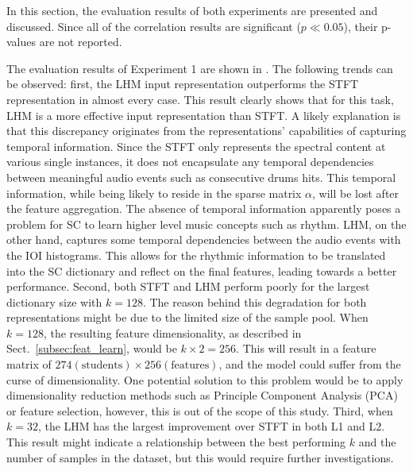 \documentclass{article}
\begin{document}
In this section, the evaluation results of both experiments are presented and discussed. Since all of the correlation results are significant ($p\ll 0.05$), their p-values are not reported.  

The evaluation results of Experiment 1 are shown in . The following trends can be observed: first, the LHM input representation outperforms the STFT representation in almost every case. This result clearly shows that for this task, LHM is a more effective input representation than STFT. A likely explanation is that this discrepancy originates from the representations' capabilities of capturing temporal information. Since the STFT only represents the spectral content at various single instances, it does not encapsulate any temporal dependencies between meaningful audio events such as consecutive drums hits. This temporal information, while being likely to reside in the sparse matrix $\alpha$, will be lost after the feature aggregation. The absence of temporal information apparently poses a problem for SC to learn higher level music concepts such as rhythm. LHM, on the other hand, captures some temporal dependencies between the audio events with the IOI histograms. This allows for the rhythmic information to be translated into the SC dictionary and reflect on the final features, leading towards a better performance. 
Second, both STFT and LHM perform poorly for the largest dictionary size with $k = 128$. The reason behind this degradation for both representations might be due to the limited size of the sample pool. When $k = 128$, the resulting feature dimensionality, as described in Sect.~\ref{subsec:feat_learn}, would be $k \times 2 = 256$. This will result in a feature matrix of $274 (\text{students}) \times 256 (\text{features})$, and the model could suffer from the curse of dimensionality. One potential solution to this problem would be to apply dimensionality reduction methods such as Principle Component Analysis (PCA) or feature selection, however, this is out of the scope of this study. 
Third, when $k = 32$, the LHM has the largest improvement over STFT in both L1 and L2. This result might indicate a relationship between the best performing $k$ and the number of samples in the dataset, but this would require further investigations. 
\end{document}
